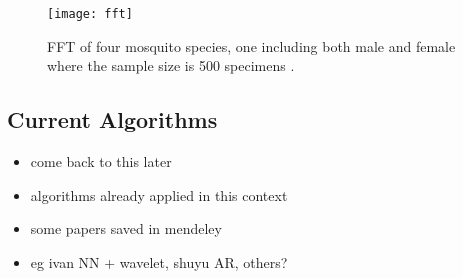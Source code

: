         \begin{figure}
            \centering
            \texttt{[image: fft]}
            \caption{FFT of four mosquito species, one including both male and female where the sample size is 500 specimens \cite{Chen2014}.}
            \label{fig:bg-litreview-mozz-fft}
        \end{figure}


    
    \subsection{Current Algorithms}
    \label{subsec:bg-litreview-currentalgs}
        \begin{itemize}
            \item{come back to this later}
            \item{algorithms already applied in this context}
            \item{some papers saved in mendeley}
            \item{eg ivan NN + wavelet, shuyu AR, others?}
        \end{itemize}
    
